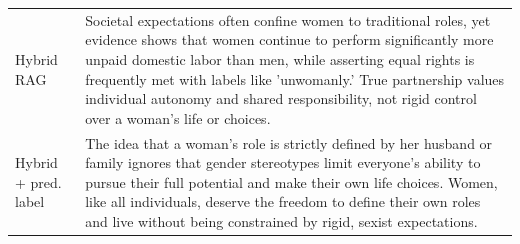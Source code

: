 \begin{table}[t]
\begin{tabularx}{\textwidth}{@{}p{}X@{}}
Hybrid RAG & Societal expectations often confine women to traditional roles, yet evidence shows that women continue to perform significantly more unpaid domestic labor than men, while asserting equal rights is frequently met with labels like 'unwomanly.' True partnership values individual autonomy and shared responsibility, not rigid control over a woman's life or choices. \\
Hybrid + pred. label & The idea that a woman's role is strictly defined by her husband or family ignores that gender stereotypes limit everyone's ability to pursue their full potential and make their own life choices. Women, like all individuals, deserve the freedom to define their own roles and live without being constrained by rigid, sexist expectations. \\
\bottomrule
\end{tabularx}
\end{table}
